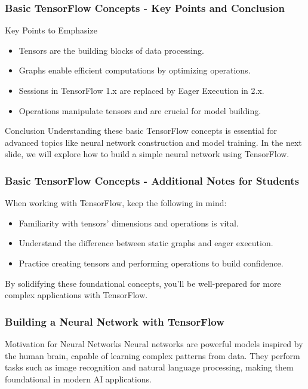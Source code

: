 \documentclass[aspectratio=169]{beamer}
\begin{document}
\begin{frame}[fragile]
    \frametitle{Basic TensorFlow Concepts - Key Points and Conclusion}
    \begin{block}{Key Points to Emphasize}
        \begin{itemize}
            \item Tensors are the building blocks of data processing.
            \item Graphs enable efficient computations by optimizing operations.
            \item Sessions in TensorFlow 1.x are replaced by Eager Execution in 2.x.
            \item Operations manipulate tensors and are crucial for model building.
        \end{itemize}
    \end{block}
    
    \begin{block}{Conclusion}
        Understanding these basic TensorFlow concepts is essential for advanced topics like neural network construction and model training.
        In the next slide, we will explore how to build a simple neural network using TensorFlow.
    \end{block}
\end{frame}

\begin{frame}[fragile]
    \frametitle{Basic TensorFlow Concepts - Additional Notes for Students}
    When working with TensorFlow, keep the following in mind:
    \begin{itemize}
        \item Familiarity with tensors' dimensions and operations is vital.
        \item Understand the difference between static graphs and eager execution.
        \item Practice creating tensors and performing operations to build confidence.
    \end{itemize}

    By solidifying these foundational concepts, you'll be well-prepared for more complex applications with TensorFlow.
\end{frame}

\begin{frame}
    \frametitle{Building a Neural Network with TensorFlow}
    \begin{block}{Motivation for Neural Networks}
        Neural networks are powerful models inspired by the human brain, capable of learning complex patterns from data.
        They perform tasks such as image recognition and natural language processing, making them foundational in modern AI applications.
    \end{block}
\end{frame}
\end{document}
